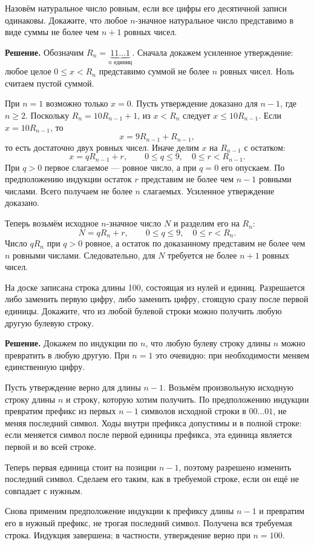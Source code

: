 \begin{problems}
\item Назовём натуральное число ровным, если все цифры его десятичной записи одинаковы. Докажите, что любое $n$-значное натуральное число представимо в виде суммы не более чем $n+1$ ровных чисел.
\par\smallskip\noindent\textbf{Решение.} Обозначим $R_n=\underbrace{11\ldots1}_{n\text{ единиц}}$. Сначала докажем усиленное утверждение: любое целое $0\le x<R_n$ представимо суммой не более $n$ ровных чисел. Ноль считаем пустой суммой.
\par При $n=1$ возможно только $x=0$. Пусть утверждение доказано для $n-1$, где $n\ge2$. Поскольку $R_n=10R_{n-1}+1$, из $x<R_n$ следует $x\le10R_{n-1}$. Если $x=10R_{n-1}$, то
\[
x=9R_{n-1}+R_{n-1},
\]
то есть достаточно двух ровных чисел. Иначе делим $x$ на $R_{n-1}$ с остатком:
\[
x=qR_{n-1}+r,\qquad 0\le q\le9,\quad 0\le r<R_{n-1}.
\]
При $q>0$ первое слагаемое --- ровное число, а при $q=0$ его опускаем. По предположению индукции остаток $r$ представим не более чем $n-1$ ровными числами. Всего получаем не более $n$ слагаемых. Усиленное утверждение доказано.
\par Теперь возьмём исходное $n$-значное число $N$ и разделим его на $R_n$:
\[
N=qR_n+r,\qquad 0\le q\le9,\quad 0\le r<R_n.
\]
Число $qR_n$ при $q>0$ ровное, а остаток по доказанному представим не более чем $n$ ровными числами. Следовательно, для $N$ требуется не более $n+1$ ровных чисел.\par

\item На доске записана строка длины 100, состоящая из нулей и единиц. Разрешается либо заменить первую цифру, либо заменить цифру, стоящую сразу после первой единицы. Докажите, что из любой булевой строки можно получить любую другую булевую строку.
\par\smallskip\noindent\textbf{Решение.} Докажем по индукции по $n$, что любую булеву строку длины $n$ можно превратить в любую другую. При $n=1$ это очевидно: при необходимости меняем единственную цифру.
\par Пусть утверждение верно для длины $n-1$. Возьмём произвольную исходную строку длины $n$ и строку, которую хотим получить. По предположению индукции превратим префикс из первых $n-1$ символов исходной строки в $00\ldots01$, не меняя последний символ. Ходы внутри префикса допустимы и в полной строке: если меняется символ после первой единицы префикса, эта единица является первой и во всей строке.
\par Теперь первая единица стоит на позиции $n-1$, поэтому разрешено изменить последний символ. Сделаем его таким, как в требуемой строке, если он ещё не совпадает с нужным.
\par Снова применим предположение индукции к префиксу длины $n-1$ и превратим его в нужный префикс, не трогая последний символ. Получена вся требуемая строка. Индукция завершена; в частности, утверждение верно при $n=100$.\par


\end{problems}
